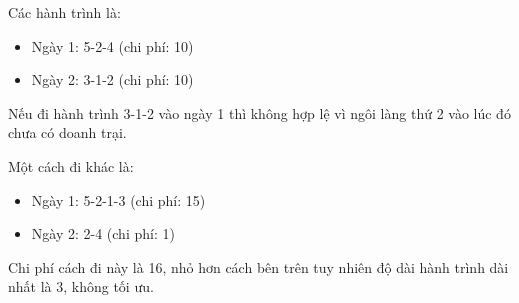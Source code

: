 Các hành trình là:
\begin{itemize}
	\item Ngày 1: 5-2-4 (chi phí: 10)
	\item Ngày 2: 3-1-2 (chi phí: 10)
\end{itemize}

Nếu đi hành trình 3-1-2 vào ngày 1 thì không hợp lệ vì ngôi làng thứ 2 vào lúc đó chưa có doanh trại.

Một cách đi khác là:
\begin{itemize}
	\item Ngày 1: 5-2-1-3 (chi phí: 15)
	\item Ngày 2: 2-4 (chi phí: 1)
\end{itemize}

Chi phí cách đi này là 16, nhỏ hơn cách bên trên tuy nhiên độ dài hành trình dài nhất là 3, không tối ưu.
\begin{itemize}
\end{itemize}
